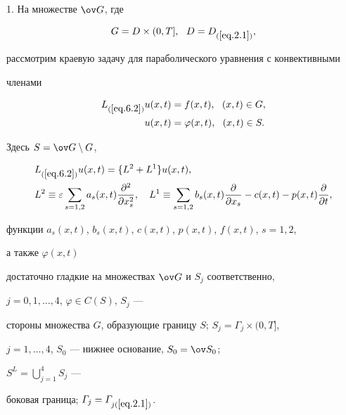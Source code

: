1. На множестве $\ov G$, где


\begin{equation} \label{eq.6.1}


G=D\times (0,T], \ \ D=D_{(\ref{eq.2.1})},


\end{equation}


рассмотрим краевую задачу для параболического уравнения с конвективными


членами


\begin{equation} \label{eq.6.2}


\begin{split}


L_{(\ref{eq.6.2})} u(x,t)&=f(x,t), \ \ (x,t)\in G,\\


u(x,t)&=\varphi(x,t), \ \ (x,t)\in S.


\end{split}


\end{equation}


Здесь $S=\ov G\setminus G$,


\begin{align}\label{eq.6.3}


&L_{(\ref{eq.6.2})}u(x,t)=\{L^2+L^1\}u(x,t),\\


&L^2\equiv\varepsilon\sum\limits_{s=1,2}a_s(x,t)


\frac{\partial^2}{\partial x_s^2},\quad


L^1\equiv\sum\limits_{s=1,2}b_s(x,t)


\frac{\partial}{\partial x_s}-c(x,t)-p(x,t)\frac{\partial}{\partial t},\notag


\end{align}


функции $a_s(x,t)$, $b_s(x,t)$, $c(x,t)$, $p(x,t)$, $f(x,t)$, $s=1,2$,


а также $\varphi(x,t)$


достаточно гладкие на множествах $\ov G$ и $S_j$ соответственно,


$j=0,1,\dotsc,4$, $\varphi\in C(S)$, $S_j$ ---


стороны множества $G$, образующие границу $S$; $S_j=\varGamma_j\times (0,T]$,


$j=1,\dotsc,4$, $S_0$ --- нижнее основание, $S_0=\ov S_0$;


$S^L=\bigcup\limits^4_{j=1} S_j$ ---


боковая граница; $\varGamma_j=\varGamma_{j(\ref{eq.2.1})}$.


